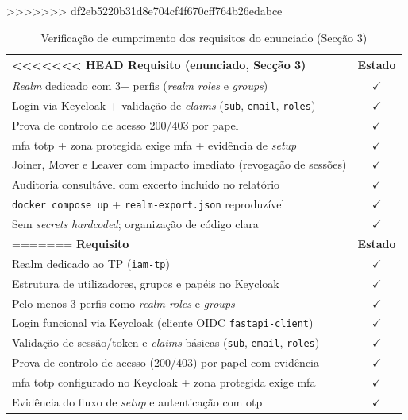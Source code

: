 \begin{table}[h!]
\begin{table}[h!]
\centering
\caption{Verificação de cumprimento dos requisitos do enunciado (Secção 3)}
>>>>>>> df2eb5220b31d8e704cf4f670cff764b26edabce
\label{tab:requisitos}
\begin{tabularx}{\textwidth}{|X|c|}
\hline
<<<<<<< HEAD
\textbf{Requisito (enunciado, Secção 3)} & \textbf{Estado} \\ \hline
\textit{Realm} dedicado com 3+ perfis (\textit{realm roles} e \textit{groups}) & $\checkmark$ \\ \hline
Login via Keycloak + validação de \textit{claims} (\texttt{sub}, \texttt{email}, \texttt{roles}) & $\checkmark$ \\ \hline
Prova de controlo de acesso 200/403 por papel & $\checkmark$ \\ \hline
\gls{mfa} \gls{totp} + zona protegida exige \gls{mfa} + evidência de \textit{setup} & $\checkmark$ \\ \hline
Joiner, Mover e Leaver com impacto imediato (revogação de sessões) & $\checkmark$ \\ \hline
Auditoria consultável com excerto incluído no relatório & $\checkmark$ \\ \hline
\texttt{docker compose up} + \texttt{realm-export.json} reproduzível & $\checkmark$ \\ \hline
Sem \textit{secrets} \textit{hardcoded}; organização de código clara & $\checkmark$ \\ \hline
=======
\textbf{Requisito} & \textbf{Estado} \\ \hline
Realm dedicado ao TP (\texttt{iam-tp}) & $\checkmark$ \\ \hline
Estrutura de utilizadores, grupos e papéis no Keycloak & $\checkmark$ \\ \hline
Pelo menos 3 perfis como \textit{realm roles} e \textit{groups} & $\checkmark$ \\ \hline
Login funcional via Keycloak (cliente OIDC \texttt{fastapi-client}) & $\checkmark$ \\ \hline
Validação de sessão/token e \textit{claims} básicas (\texttt{sub}, \texttt{email}, \texttt{roles}) & $\checkmark$ \\ \hline
Prova de controlo de acesso (200/403) por papel com evidência & $\checkmark$ \\ \hline
\gls{mfa} \gls{totp} configurado no Keycloak + zona protegida exige \gls{mfa} & $\checkmark$ \\ \hline
Evidência do fluxo de \textit{setup} e autenticação com \gls{otp} & $\checkmark$ \\ \hline

\end{tabularx}
\end{table}
\end{table}
